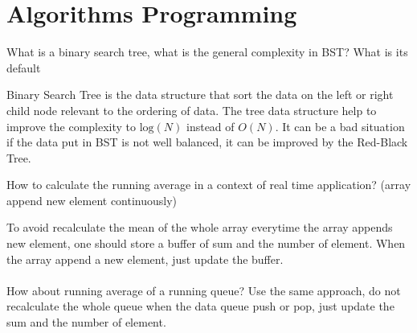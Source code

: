 \documentclass{exam}%
\newcommand*{\ANCOAALGO}{}%
\begin{document}
\ifdefined\ANCOAALGO
\newpage
\section{Algorithms Programming}
\begin{questions}

\question What is a binary search tree, what is the general complexity in BST? What is its default
\begin{solution}[.2in]
Binary Search Tree is the data structure that sort the data on the left or right child node relevant to the ordering of data. The tree data structure help to improve the complexity to $\text{log}(N)$ instead of $O(N)$. It can be a bad situation if the data put in BST is not well balanced, it can be improved by the Red-Black Tree.
\end{solution}

\question How to calculate the running average in a context of real time application? (array append new element continuously)
\begin{solution}[.2in]
	To avoid recalculate the mean of the whole array everytime the array appends new element, one should store a buffer of sum and the number of element. When the array append a new element, just update the buffer.
	\paragraph{} How about running average of a running queue? Use the same approach, do not recalculate the whole queue when the data queue push or pop, just update the sum and the number of element.
\end{solution}

\end{questions}
\fi
%
%
\end{document}
